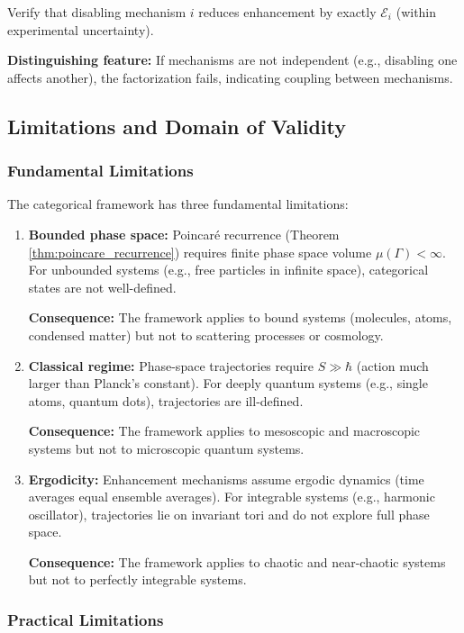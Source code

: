 \documentclass[twocolumn,10pt]{article}
\theoremstyle{remark}
\begin{document}
Verify that disabling mechanism $i$ reduces enhancement by exactly $\mathcal{E}_i$ (within experimental uncertainty).

\textbf{Distinguishing feature:} If mechanisms are not independent (e.g., disabling one affects another), the factorization fails, indicating coupling between mechanisms.

\subsection{Limitations and Domain of Validity}

\subsubsection{Fundamental Limitations}

The categorical framework has three fundamental limitations:

\begin{enumerate}
    \item \textbf{Bounded phase space:} Poincaré recurrence (Theorem \ref{thm:poincare_recurrence}) requires finite phase space volume $\mu(\Gamma) < \infty$. For unbounded systems (e.g., free particles in infinite space), categorical states are not well-defined.
    
    \textbf{Consequence:} The framework applies to bound systems (molecules, atoms, condensed matter) but not to scattering processes or cosmology.
    
    \item \textbf{Classical regime:} Phase-space trajectories require $S \gg \hbar$ (action much larger than Planck's constant). For deeply quantum systems (e.g., single atoms, quantum dots), trajectories are ill-defined.
    
    \textbf{Consequence:} The framework applies to mesoscopic and macroscopic systems but not to microscopic quantum systems.
    
    \item \textbf{Ergodicity:} Enhancement mechanisms assume ergodic dynamics (time averages equal ensemble averages). For integrable systems (e.g., harmonic oscillator), trajectories lie on invariant tori and do not explore full phase space.
    
    \textbf{Consequence:} The framework applies to chaotic and near-chaotic systems but not to perfectly integrable systems.
\end{enumerate}

\subsubsection{Practical Limitations}
\end{document}
